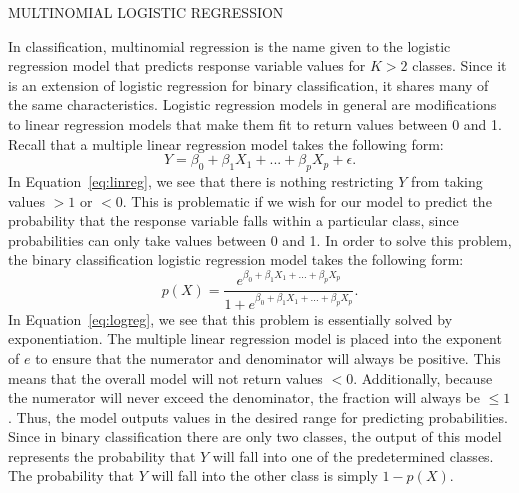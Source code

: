 \documentclass[12pt]{article}
\begin{document}
MULTINOMIAL LOGISTIC REGRESSION

In classification, multinomial regression is the name given to the 
logistic regression model that predicts response variable values for 
$K > 2$ classes.  Since it is an extension of logistic regression for 
binary classification, it shares many of the same characteristics.  
Logistic regression models in general are modifications to linear 
regression models that make them fit to return values between 0 and 1.  
Recall that a multiple linear regression model takes the following form:
\begin{equation}
  \label{eq:linreg}
  Y = \beta_0 + \beta_1X_1 + ... + \beta_pX_p + \epsilon.
\end{equation}
In Equation~\eqref{eq:linreg}, we see that there is nothing restricting 
$Y$ from taking values $> 1$ or $< 0$.  This is problematic if we wish 
for our model to predict the probability that the response variable 
falls within a particular class, since probabilities can only take 
values between 0 and 1.  In order to solve this problem, the binary 
classification logistic regression model takes the following form:
\begin{equation}
  \label{eq:logreg}
  p(X) = 
  \frac{e ^ {\beta_0 + \beta_1X_1 + ... + \beta_pX_p}} 
  {1 + e ^ {\beta_0 + \beta_1X_1 + ... + \beta_pX_p}}.
\end{equation}
In Equation~\eqref{eq:logreg}, we see that this problem is essentially 
solved by exponentiation.  The multiple linear regression model is 
placed into the exponent of $e$ to ensure that the numerator and 
denominator will always be positive.  This means that the overall 
model will not return values $< 0$.  Additionally, because the numerator 
will never exceed the denominator, the fraction will always be $\leq 1$.  
Thus, the model outputs values in the desired range for predicting probabilities. 
 Since in binary classification there are only two classes, the output of 
 this model represents the probability that $Y$ will fall into one of the 
 predetermined classes.  The probability that $Y$ will fall into the other 
 class is simply $1 - p(X)$.
\end{document}
